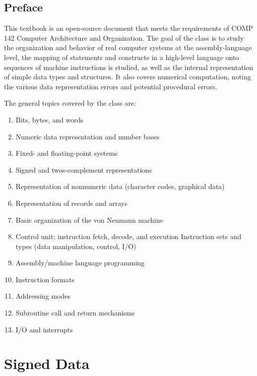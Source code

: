\documentclass[letterpaper, 12pt]{book}
\begin{document}

\section{Preface\label{sec:preface}}

This textbook is an open-source document that meets the requirements of COMP 142 Computer Architecture and Organization. The goal of the class is to study the organization and behavior of real computer systems at the assembly-language level, the mapping of statements and constructs in a high-level language onto sequences of machine instructions is studied, as well as the internal representation of simple data types and structures. It also covers numerical computation, noting the various data representation errors and potential procedural errors.

The general topics covered by the class are:

\begin{enumerate}
\item Bits, bytes, and words
\item Numeric data representation and number bases
\item Fixed- and floating-point systems
\item Signed and twos-complement representations
\item Representation of nonnumeric data (character codes, graphical data)
\item Representation of records and arrays
\item Basic organization of the von Neumann machine
\item Control unit; instruction fetch, decode, and execution
    Instruction sets and types (data manipulation, control, I/O)
\item Assembly/machine language programming
\item Instruction formats
\item Addressing modes
\item Subroutine call and return mechanisms
\item I/O and interrupts
\end{enumerate}





\chapter{Signed Data}
\end{document}
